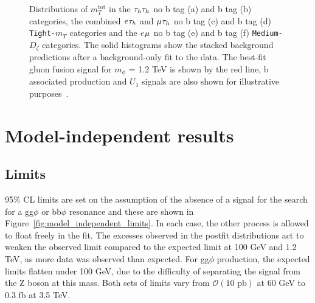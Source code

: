 \begin{figure}[!hbtp]
\caption[Plots of the $m_{T}^\text{tot}$ distributions in the high-mass optimisation categories.]{Distributions of $m_{T}^\text{tot}$ in the $\tau_{h}\tau_{h}$ no b tag (a) and b tag (b) categories, the combined $e_{}\tau_{h}$ and $\mu_{}\tau_{h}$ no b tag (c) and b tag (d) \texttt{Tight-$m_{T}$} categories and the $e_{}\mu_{}$ no b tag (e) and b tag (f) \texttt{Medium-$D_{\zeta}$} categories. The solid histograms show the stacked background predictions after a background-only fit to the data. The best-fit gluon fusion signal for $m_{\phi}$ = 1.2 TeV is shown by the red line, b associated production and $U_{1}$ signals are also shown for illustrative purposes~\cite{CMS:2022rbd}.}
\label{fig:high_mass_postfit}
\end{figure}

\section{Model-independent results}

\subsection{Limits}

95\% \ac{CL} limits are set on the assumption of the absence of a signal for the search for a gg$\phi$ or bb$\phi$ resonance and these are shown in Figure~\ref{fig:model_independent_limits}.
In each case, the other process is allowed to float freely in the fit.
The excesses observed in the postfit distributions act to weaken the observed limit compared to the expected limit at 100 GeV and 1.2 TeV, as more data was observed than expected.
For gg$\phi$ production, the expected limits flatten under 100 GeV, due to the difficulty of separating the signal from the Z boson at this mass.
Both sets of limits vary from $\mathcal{O}(10\text{ pb})$ at 60 GeV to $0.3$ fb at 3.5 TeV. \\


